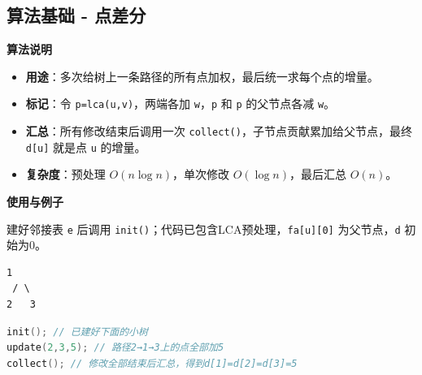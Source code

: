 \documentclass[10pt,landscape,a4paper]{article}
\begin{document}
\begin{multicols*}{3}
\subsection*{算法基础 - 点差分}
\par\addvspace{0.7ex}\noindent\textbf{算法说明}\par\nobreak
\begin{itemize}
\item \textbf{用途}：多次给树上一条路径的所有点加权，最后统一求每个点的增量。
\item \textbf{标记}：令 \texttt{p\allowbreak{}=\allowbreak{}l\allowbreak{}c\allowbreak{}a\allowbreak{}(\allowbreak{}u\allowbreak{},\allowbreak{}v\allowbreak{})}，两端各加 \texttt{w}，\texttt{p} 和 \texttt{p} 的父节点各减 \texttt{w}。
\item \textbf{汇总}：所有修改结束后调用一次 \texttt{c\allowbreak{}o\allowbreak{}l\allowbreak{}l\allowbreak{}e\allowbreak{}c\allowbreak{}t\allowbreak{}(\allowbreak{})}，子节点贡献累加给父节点，最终 \texttt{d\allowbreak{}[\allowbreak{}u\allowbreak{}]} 就是点 \texttt{u} 的增量。
\item \textbf{复杂度}：预处理 $O(n\log n)$，单次修改 $O(\log n)$，最后汇总 $O(n)$。
\end{itemize}
\par\addvspace{0.7ex}\noindent\textbf{使用与例子}\par\nobreak
建好邻接表 \texttt{e} 后调用 \texttt{i\allowbreak{}n\allowbreak{}i\allowbreak{}t\allowbreak{}(\allowbreak{})}；代码已包含LCA预处理，\texttt{f\allowbreak{}a\allowbreak{}[\allowbreak{}u\allowbreak{}]\allowbreak{}[\allowbreak{}0\allowbreak{}]} 为父节点，\texttt{d} 初始为0。\par
\begin{lstlisting}[language={},numbers=none,basicstyle=\footnotesize\ttfamily]
  1
 / \
2   3
\end{lstlisting}

\begin{lstlisting}[language=C++,numbers=none,basicstyle=\footnotesize\ttfamily]
init(); // 已建好下面的小树
update(2,3,5); // 路径2→1→3上的点全部加5
collect(); // 修改全部结束后汇总，得到d[1]=d[2]=d[3]=5
\end{lstlisting}


\end{multicols*}
\end{document}
